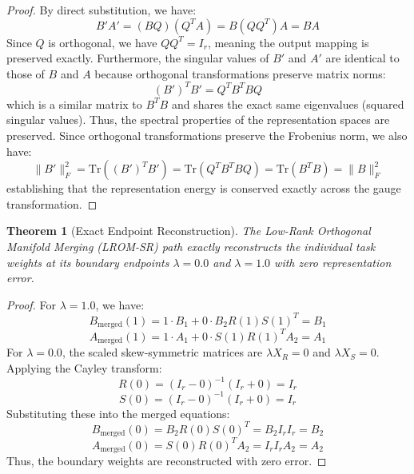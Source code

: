 \documentclass{article}
\theoremstyle{plain}
\newtheorem{theorem}{Theorem}[section]
\theoremstyle{definition}
\theoremstyle{remark}
\begin{document}
\begin{proof}
By direct substitution, we have:
\begin{equation}
B' A' = (BQ)(Q^T A) = B(QQ^T)A = BA
\end{equation}
Since $Q$ is orthogonal, we have $QQ^T = I_r$, meaning the output mapping is preserved exactly. Furthermore, the singular values of $B' $ and $A'$ are identical to those of $B$ and $A$ because orthogonal transformations preserve matrix norms:
\begin{equation}
(B')^T B' = Q^T B^T B Q
\end{equation}
which is a similar matrix to $B^T B$ and shares the exact same eigenvalues (squared singular values). Thus, the spectral properties of the representation spaces are preserved. Since orthogonal transformations preserve the Frobenius norm, we also have:
\begin{equation}
\|B'\|_F^2 = \text{Tr}((B')^T B') = \text{Tr}(Q^T B^T B Q) = \text{Tr}(B^T B) = \|B\|_F^2
\end{equation}
establishing that the representation energy is conserved exactly across the gauge transformation.
\end{proof}

\begin{theorem}[Exact Endpoint Reconstruction]
The Low-Rank Orthogonal Manifold Merging (LROM-SR) path exactly reconstructs the individual task weights at its boundary endpoints $\lambda = 0.0$ and $\lambda = 1.0$ with zero representation error.
\end{theorem}

\begin{proof}
For $\lambda = 1.0$, we have:
\begin{equation}
B_{\text{merged}}(1) = 1 \cdot B_1 + 0 \cdot B_2 R(1) S(1)^T = B_1
\end{equation}
\begin{equation}
A_{\text{merged}}(1) = 1 \cdot A_1 + 0 \cdot S(1) R(1)^T A_2 = A_1
\end{equation}
For $\lambda = 0.0$, the scaled skew-symmetric matrices are $\lambda X_R = 0$ and $\lambda X_S = 0$. Applying the Cayley transform:
\begin{equation}
R(0) = (I_r - 0)^{-1}(I_r + 0) = I_r
\end{equation}
\begin{equation}
S(0) = (I_r - 0)^{-1}(I_r + 0) = I_r
\end{equation}
Substituting these into the merged equations:
\begin{equation}
B_{\text{merged}}(0) = B_2 R(0) S(0)^T = B_2 I_r I_r = B_2
\end{equation}
\begin{equation}
A_{\text{merged}}(0) = S(0) R(0)^T A_2 = I_r I_r A_2 = A_2
\end{equation}
Thus, the boundary weights are reconstructed with zero error.
\end{proof}
\end{document}
